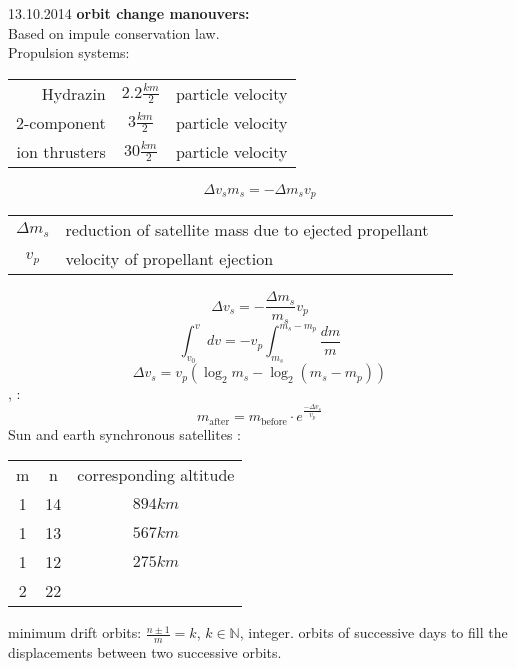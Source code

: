 \begin{chapter}{13.10.2014}
 \textbf{orbit change manouvers:}\\
 Based on impule conservation law.\\
 Propulsion systems:\\
 \begin{tabular}{rcl}
  Hydrazin & $2.2\frac{km}{2}$ & particle velocity\\
  2-component & $3\frac{km}{2}$ & particle velocity\\
  ion thrusters & $30\frac{km}{2}$ & particle velocity\\
 \end{tabular}
 \[ \Delta v_s m_s = -\Delta m_s v_p \]
 \begin{tabular}{c|l|c}
  $\Delta m_s$ &reduction of satellite mass due to ejected propellant&\\
  $v_p$ &velocity of propellant ejection&\\
 \end{tabular}
 \[ \Delta v_s = -\frac{\Delta m_s}{m_s}v_p \]
 \[ \int_{v_0}^v dv = -v_p \int_{m_s}^{m_s-m_p} \frac{dm}{m}\]
 \[ \Delta v_s = v_p (\log_2 m_s - \log_2 (m_s-m_p)) \]
 , :
 \[ m_\text{after} = m_\text{before} \cdot e^{\frac{-\Delta v_s}{v_p}} \]
 Sun and earth synchronous satellites :\\
 \begin{tabular}{ccc}
  m & n & corresponding altitude\\
  1&14&$894 km$\\
  1&13&$567 km$\\
  1&12&$275 km$\\
  2&22&\\
 \end{tabular}
 
 minimum drift orbits: $\frac{n \pm 1}{m} = k$, $k \in \mathbb{N}$, integer. orbits of successive days to fill the displacements between two successive orbits.\\
\end{chapter} 